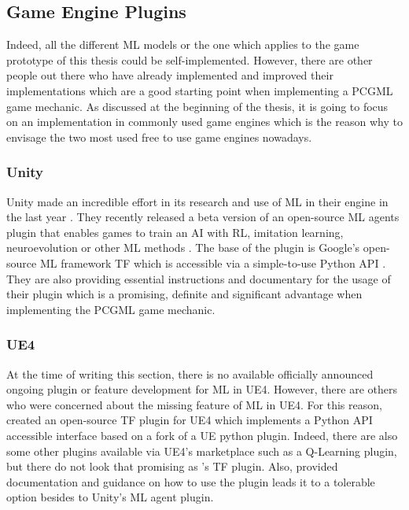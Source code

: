 \documentclass[MGS,Master,english]{twbook}%
\begin{document}
\subsection{Game Engine Plugins} \label{chapter::mlPluginsGameEngines}
Indeed, all the different \ac{ML} models or the one which applies to the game prototype of this thesis could be self-implemented. However, there are other people out there who have already implemented and improved their implementations which are a good starting point when implementing a \ac{PCGML} game mechanic. As discussed at the beginning of the thesis, it is going to focus on an implementation in commonly used game engines which is the reason why to envisage the two most used free to use game engines nowadays.

\subsubsection{Unity}
Unity made an incredible effort in its research and use of \ac{ML} in their engine in the last year \cite{unity::ml}. They recently released a beta version of an open-source \ac{ML} agents plugin that enables games to train an \ac{AI} with \ac{RL}, imitation learning, neuroevolution or other \ac{ML} methods \cite{unity::mlGithub}. The base of the plugin is Google’s open-source \ac{ML} framework \acf{TF} \cite{api::tensorFlow} which is accessible via a simple-to-use Python \ac{API} \cite{unity::mlGithub}. They are also providing essential instructions and documentary for the usage of their plugin which is a promising, definite and significant advantage when implementing the \ac{PCGML} game mechanic.

\subsubsection{\acl{UE4}}
At the time of writing this section, there is no available officially announced ongoing plugin or feature development for \ac{ML} in \ac{UE4}. However, there are others who were concerned about the missing feature of \ac{ML} in \ac{UE4}. For this reason, \citep{ue4::tensorFlowPlugin} created an open-source \ac{TF} plugin for \ac{UE4} which implements a Python \ac{API} accessible interface based on a fork of a UE python plugin. Indeed, there are also some other plugins available via \ac{UE4}'s marketplace such as a Q-Learning plugin, but there do not look that promising as 's \ac{TF} plugin. Also, provided documentation and guidance on how to use the plugin leads it to a tolerable option besides to Unity’s \ac{ML} agent plugin.
\end{document}
